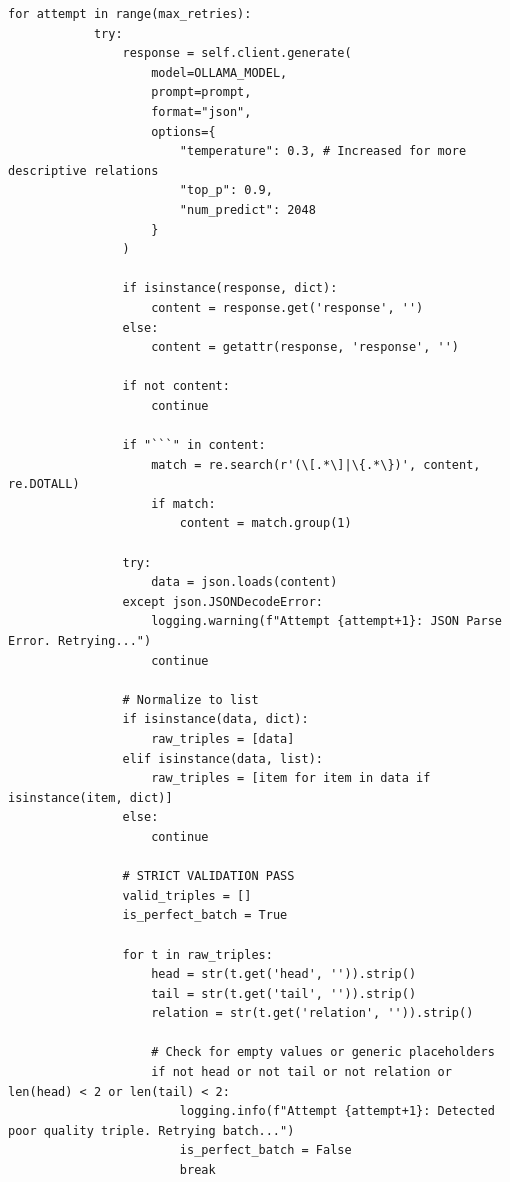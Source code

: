 \documentclass[11pt]{article}
\begin{document}
\begin{lstlisting}[style=pythoncode, caption={kg\_generator.py}]
        for attempt in range(max_retries):
            try:
                response = self.client.generate(
                    model=OLLAMA_MODEL, 
                    prompt=prompt, 
                    format="json",
                    options={
                        "temperature": 0.3, # Increased for more descriptive relations
                        "top_p": 0.9,
                        "num_predict": 2048
                    }
                )
                
                if isinstance(response, dict):
                    content = response.get('response', '')
                else:
                    content = getattr(response, 'response', '')

                if not content:
                    continue
                    
                if "```" in content:
                    match = re.search(r'(\[.*\]|\{.*\})', content, re.DOTALL)
                    if match:
                        content = match.group(1)
                    
                try:
                    data = json.loads(content)
                except json.JSONDecodeError:
                    logging.warning(f"Attempt {attempt+1}: JSON Parse Error. Retrying...")
                    continue

                # Normalize to list
                if isinstance(data, dict):
                    raw_triples = [data]
                elif isinstance(data, list):
                    raw_triples = [item for item in data if isinstance(item, dict)]
                else:
                    continue

                # STRICT VALIDATION PASS
                valid_triples = []
                is_perfect_batch = True
                
                for t in raw_triples:
                    head = str(t.get('head', '')).strip()
                    tail = str(t.get('tail', '')).strip()
                    relation = str(t.get('relation', '')).strip()
                    
                    # Check for empty values or generic placeholders
                    if not head or not tail or not relation or len(head) < 2 or len(tail) < 2:
                        logging.info(f"Attempt {attempt+1}: Detected poor quality triple. Retrying batch...")
                        is_perfect_batch = False
                        break
                    

\end{lstlisting}
\end{document}
